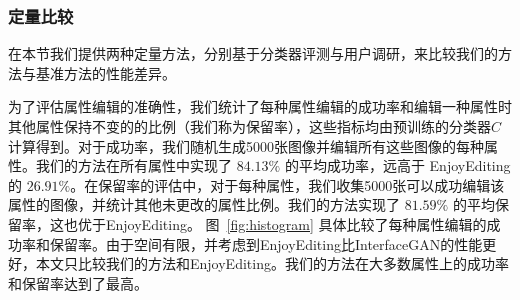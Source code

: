 \subsubsection{定量比较}
在本节我们提供两种定量方法，分别基于分类器评测与用户调研，来比较我们的方法与基准方法的性能差异。

为了评估属性编辑的准确性，我们统计了每种属性编辑的成功率和编辑一种属性时其他属性保持不变的的比例（我们称为保留率），这些指标均由预训练的分类器$C$计算得到。对于成功率，我们随机生成5000张图像并编辑所有这些图像的每种属性。我们的方法在所有属性中实现了 $84.13\%$ 的平均成功率，远高于 En​​joyEditing 的 $26.91\%$。在保留率的评估中，对于每种属性，我们收集5000张可以成功编辑该属性的图像，并统计其他未更改的属性比例。我们的方法实现了 $81.59\%$ 的平均保留率，这也优于EnjoyEditing。 图~\ref{fig:histogram} 具体比较了每种属性编辑的成功率和保留率。由于空间有限，并考虑到EnjoyEditing比InterfaceGAN的性能更好，本文只比较我们的方法和EnjoyEditing。我们的方法在大多数属性上的成功率和保留率达到了最高。

